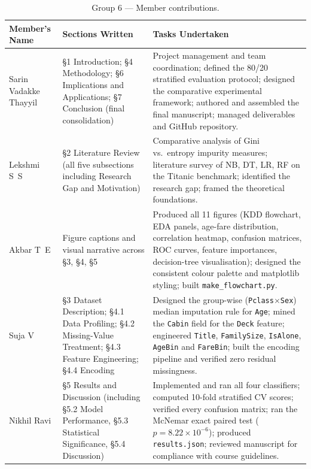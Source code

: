 \documentclass[11pt,a4paper]{article}
\begin{document}
\renewcommand{\arraystretch}{1.35}
\begin{table}[H]
\centering
\caption{Group 6 --- Member contributions.}
\small
\begin{tabular}{@{}p{}p{}p{}@{}}
\toprule
\textbf{Member's Name} & \textbf{Sections Written} & \textbf{Tasks Undertaken} \\
\midrule
Sarin Vadakke Thayyil
& \S1 Introduction; \S4 Methodology; \S6 Implications and Applications;
  \S7 Conclusion (final consolidation)
& Project management and team coordination; defined the 80/20 stratified
  evaluation protocol; designed the comparative experimental framework;
  authored and assembled the final manuscript; managed deliverables and
  GitHub repository.
\\
\addlinespace
Lekshmi S~S
& \S2 Literature Review (all five subsections including Research Gap and
  Motivation)
& Comparative analysis of Gini vs.\ entropy impurity measures; literature
  survey of NB, DT, LR, RF on the Titanic benchmark; identified the research
  gap; framed the theoretical foundations.
\\
\addlinespace
Akbar T~E
& Figure captions and visual narrative across \S3, \S4, \S5
& Produced all 11 figures (KDD flowchart, EDA panels, age-fare distribution,
  correlation heatmap, confusion matrices, ROC curves, feature importances,
  decision-tree visualisation); designed the consistent colour palette and
  matplotlib styling; built \texttt{make\_flowchart.py}.
\\
\addlinespace
Suja V
& \S3 Dataset Description; \S4.1 Data Profiling; \S4.2 Missing-Value
  Treatment; \S4.3 Feature Engineering; \S4.4 Encoding
& Designed the group-wise (\texttt{Pclass}$\times$\texttt{Sex}) median
  imputation rule for \texttt{Age}; mined the \texttt{Cabin} field for the
  \texttt{Deck} feature; engineered \texttt{Title}, \texttt{FamilySize},
  \texttt{IsAlone}, \texttt{AgeBin} and \texttt{FareBin}; built the encoding
  pipeline and verified zero residual missingness.
\\
\addlinespace
Nikhil Ravi
& \S5 Results and Discussion (including \S5.2 Model Performance, \S5.3
  Statistical Significance, \S5.4 Discussion)
& Implemented and ran all four classifiers; computed 10-fold stratified CV
  scores; verified every confusion matrix; ran the McNemar exact paired
  test ($p = 8.22\times 10^{-6}$); produced \texttt{results.json};
  reviewed manuscript for compliance with course guidelines.
\\
\bottomrule
\end{tabular}
\end{table}
\end{document}
